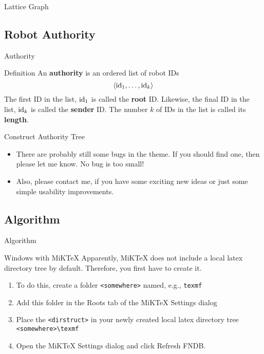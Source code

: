 \documentclass[10pt]{beamer}
\newcommand{\id}{{\rm id}}
\begin{document}
\begin{frame}{Lattice Graph}
  \begin{block}{}
   
  \end{block}
\end{frame}

\subsection{Robot Authority}
\begin{frame}{Authority}
  \begin{block}{}
    \begin{bclogo}[couleur=orange!10, arrondi=0.2, ombre=true]{Definition} 
      An \textbf{authority} is an ordered list of robot IDs
      $$ \langle \id_1, \ldots, \id_k \rangle $$
      The first ID in the list, $\id_1$ is called the \textbf{root} ID.
      Likewise, the final ID in the list, $\id_k$ is called the
      \textbf{sender} ID.  The number $k$ of IDs in the list is called
      its \textbf{length}.
    \end{bclogo}
  \end{block}
\end{frame}
\begin{frame}{Construct Authority Tree}{}
  \begin{itemize}
    \item<1-> There are probably still some bugs in the theme. If you should find one, then please let me know. No bug is too small!
    \item<2-> Also, please contact me, if you have some exciting new ideas or just some simple usability improvements.
  \end{itemize}
\end{frame}


\subsection{Algorithm}
\begin{frame}{Algorithm}{}
  \begin{block}{Windows with MiKTeX}
    Apparently, MiKTeX does not include a local latex directory tree by default. Therefore, you first have to create it.
    \begin{enumerate}
      \item To do this, create a folder {\tt <somewhere>} named, e.g., {\tt texmf}
      \item Add this folder in the Roots tab of the MiKTeX Settings dialog
      \item Place the {\tt <dirstruct>} in your newly created local latex directory tree\\
    {\tt <somewhere>\textbackslash texmf}\\
      \item Open the MiKTeX Settings dialog and click Refresh FNDB.
    \end{enumerate}
  \end{block}
\end{frame}
\end{document}
